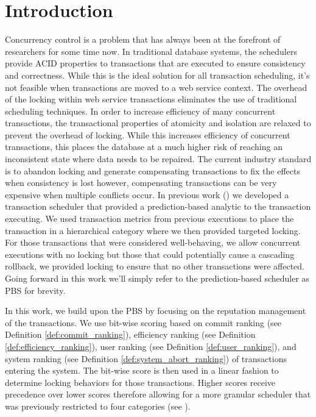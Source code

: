 \section{Introduction}
\label{sec:introduction}

Concurrency control is a problem that has always been at the forefront of researchers for some time now. In traditional database systems, the schedulers provide \ac{ACID} properties to transactions that are executed to ensure consistency and correctness. While this is the ideal solution for all transaction scheduling, it's not feasible when transactions are moved to a web service context. The overhead of the locking within web service transactions eliminates the use of traditional scheduling techniques. In order to increase efficiency of many concurrent transactions, the transactional properties of atomicity and isolation are relaxed to prevent the overhead of locking. While this increases efficiency of concurrent transactions, this places the database at a much higher risk of reaching an inconsistent state where data needs to be repaired. The current industry standard is to abandon locking and generate compensating transactions to fix the effects when consistency is lost however, compensating transactions can be very expensive when multiple conflicts occur. In previous work (\cite{ravan_ensuring_2020}) we developed a transaction scheduler that provided a prediction-based analytic to the transaction executing. We used transaction metrics from previous executions to place the transaction in a hierarchical category where we then provided targeted locking. For those transactions that were considered well-behaving, we allow concurrent executions with no locking but those that could potentially cause a cascading rollback, we provided locking to ensure that no other transactions were affected. Going forward in this work we'll simply refer to the prediction-based scheduler as PBS for brevity. 

In this work, we build upon the \ac{PBS} by focusing on the reputation management of the transactions. We use bit-wise scoring based on commit ranking (see Definition \ref{def:commit_ranking}),  efficiency ranking (see Definition \ref{def:efficiency_ranking}), user ranking (see Definition \ref{def:user_ranking}), and system ranking (see Definition \ref{def:system_abort_ranking}) of transactions entering the system. The bit-wise score is then used in a linear fashion to determine locking behaviors for those transactions. Higher scores receive precedence over lower scores therefore allowing for a more granular scheduler that was previously restricted to four categories (see \cite{ravan_ensuring_2020}).

